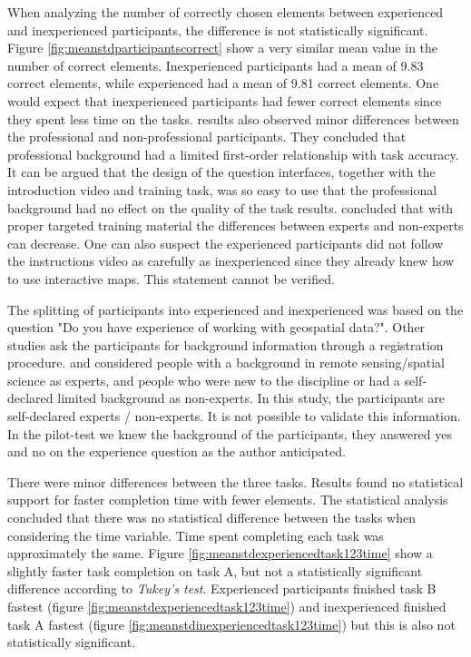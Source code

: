 When analyzing the number of correctly chosen elements between experienced and inexperienced participants, the difference is not statistically significant. Figure \ref{fig:meanstdparticipantscorrect} show a very similar mean value in the number of correct elements. Inexperienced participants had a mean of 9.83 correct elements, while experienced had a mean of 9.81 correct elements. One would expect that inexperienced participants had fewer correct elements since they spent less time on the tasks. \cite{Salk2016} results also observed minor differences between the professional and non-professional participants. They concluded that professional background had a limited first-order relationship with task accuracy. It can be argued that the design of the question interfaces, together with the introduction video and training task, was so easy to use that the professional background had no effect on the quality of the task results. \cite{See2013} concluded that with proper targeted training material the differences between experts and non-experts can decrease. One can also suspect the experienced participants did not follow the instructions video as carefully as inexperienced since they already knew how to use interactive maps. This statement cannot be verified.

The splitting of participants into experienced and inexperienced was based on the question "Do you have experience of working with geospatial data?". Other studies ask the participants for background information through a registration procedure. \cite{See2013} and \cite{Salk2016} considered people with a background in remote sensing/spatial science as experts, and people who were new to the discipline or had a self-declared limited background as non-experts. In this study, the participants are self-declared experts / non-experts. It is not possible to validate this information. In the pilot-test we knew the background of the participants, they answered yes and no on the experience question as the author anticipated. 

There were minor differences between the three tasks. Results found no statistical support for faster completion time with fewer elements. The statistical analysis concluded that there was no statistical difference between the tasks when considering the time variable. Time spent completing each task was approximately the same. Figure \ref{fig:meanstdexperiencedtask123time} show a slightly faster task completion on task A, but not a statistically significant difference according to \textit{Tukey's test}. Experienced participants finished task B fastest (figure \ref{fig:meanstdexperiencedtask123time}) and inexperienced finished task A fastest (figure \ref{fig:meanstdinexperiencedtask123time}) but this is also not statistically significant. 

